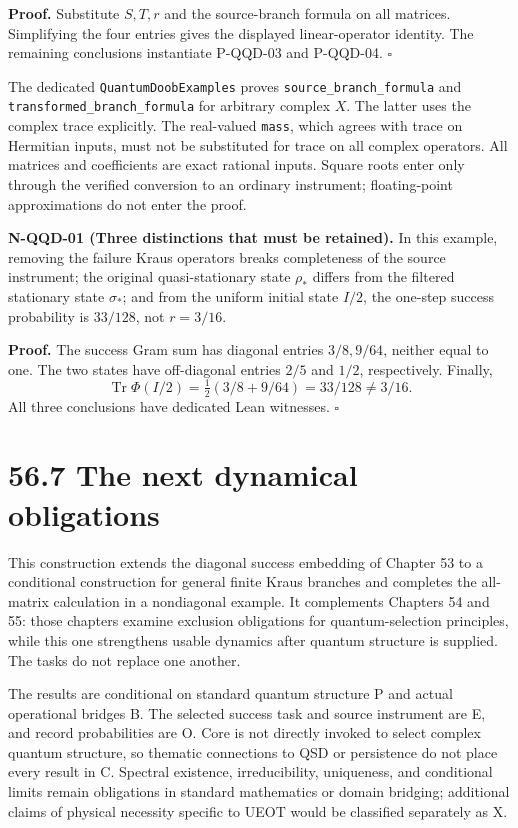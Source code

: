 \documentclass[
  11pt,
  oneside]{book}
\begin{document}
\textbf{Proof.} Substitute \(S,T,r\) and the source-branch formula on
all matrices. Simplifying the four entries gives the displayed
linear-operator identity. The remaining conclusions instantiate P-QQD-03
and P-QQD-04. \(\square\)

The dedicated \texttt{Quantum\allowbreak Doob\allowbreak Examples} proves
\texttt{source\_\allowbreak branch\_\allowbreak formula} and
\texttt{transformed\_\allowbreak branch\_\allowbreak formula} for arbitrary complex \(X\). The
latter uses the complex trace explicitly. The real-valued \texttt{mass},
which agrees with trace on Hermitian inputs, must not be substituted for
trace on all complex operators. All matrices and coefficients are exact
rational inputs. Square roots enter only through the verified conversion
to an ordinary instrument; floating-point approximations do not enter
the proof.

\label{n-qqd-01}{}

\textbf{N-QQD-01 (Three distinctions that must be retained).} In this
example, removing the failure Kraus operators breaks completeness of the
source instrument; the original quasi-stationary state \(\rho_*\)
differs from the filtered stationary state \(\sigma_*\); and from the
uniform initial state \(I/2\), the one-step success probability is
\(33/128\), not \(r=3/16\).

\textbf{Proof.} The success Gram sum has diagonal entries \(3/8,9/64\),
neither equal to one. The two states have off-diagonal entries \(2/5\)
and \(1/2\), respectively. Finally, \[
\operatorname{Tr}\Phi(I/2)=\tfrac12(3/8+9/64)=33/128\ne3/16.
\] All three conclusions have dedicated Lean witnesses. \(\square\)

\section{56.7 The next dynamical obligations}

This construction extends the diagonal success embedding of Chapter 53
to a conditional construction for general finite Kraus branches and
completes the all-matrix calculation in a nondiagonal example. It
complements Chapters 54 and 55: those chapters examine exclusion
obligations for quantum-selection principles, while this one strengthens
usable dynamics after quantum structure is supplied. The tasks do not
replace one another.

The results are conditional on standard quantum structure P and actual
operational bridges B. The selected success task and source instrument
are E, and record probabilities are O. Core is not directly invoked to
select complex quantum structure, so thematic connections to QSD or
persistence do not place every result in C. Spectral existence,
irreducibility, uniqueness, and conditional limits remain obligations in
standard mathematics or domain bridging; additional claims of physical
necessity specific to UEOT would be classified separately as X.
\end{document}
